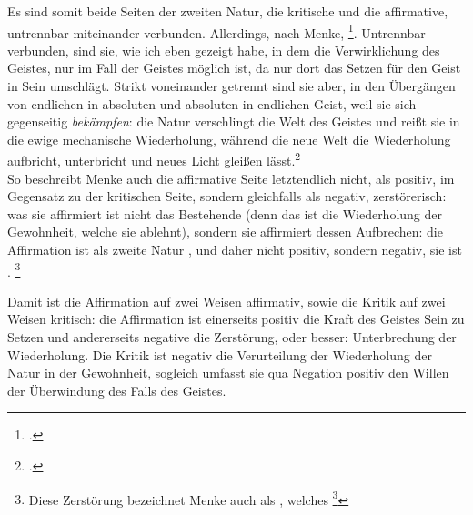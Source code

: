 \documentclass[12pt, a4paper, openany]{report}
\begin{document}
Es sind somit beide Seiten der zweiten Natur, die kritische und die affirmative, untrennbar miteinander verbunden.
Allerdings, nach Menke, \footcite[][147]{menke_autonomie_2018}.
Untrennbar verbunden, sind sie, wie ich eben gezeigt habe, in dem die Verwirklichung des Geistes, nur im Fall der Geistes möglich ist, da nur dort das Setzen für den Geist in Sein umschlägt. 
Strikt voneinander getrennt sind sie aber, in den Übergängen von endlichen in absoluten und absoluten in endlichen Geist, weil sie sich gegenseitig \emph{bekämpfen}:
die Natur verschlingt die Welt des Geistes und reißt sie in die ewige mechanische Wiederholung, während die neue Welt die Wiederholung aufbricht, unterbricht und neues Licht gleißen lässt.\footcite[Vgl.][147]{menke_autonomie_2018}
\\
So beschreibt Menke auch die affirmative Seite letztendlich nicht, als positiv, im Gegensatz zu der kritischen Seite, sondern gleichfalls als negativ, zerstörerisch:
was sie affirmiert ist nicht das Bestehende (denn das ist die Wiederholung der Gewohnheit, welche sie ablehnt), sondern sie affirmiert dessen Aufbrechen: 
die Affirmation ist als  zweite Natur , und daher nicht positiv, sondern negativ, sie ist .%
\footnote{
    \cite[][S. 148. Hervorhebung von mir.]{menke_autonomie_2018}
    Diese Zerstörung bezeichnet Menke auch als , welches \footcite[][147]{menke_autonomie_2018}
}

Damit ist die Affirmation auf zwei Weisen affirmativ, sowie die Kritik auf zwei Weisen kritisch: 
die Affirmation ist einerseits positiv die Kraft des Geistes Sein zu Setzen und andererseits negative die Zerstörung, oder besser: Unterbrechung der Wiederholung. 
Die Kritik ist negativ die Verurteilung der Wiederholung der Natur in der Gewohnheit, sogleich umfasst sie qua Negation positiv den Willen der Überwindung des Falls des Geistes.\\
\end{document}
